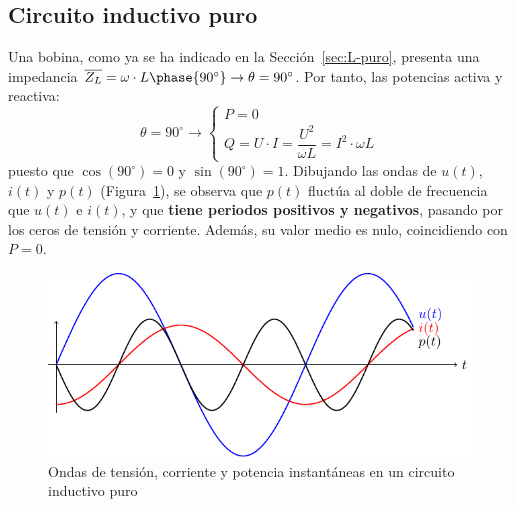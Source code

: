 \subsection{Circuito inductivo puro}\label{sec:potencia_L}
Una bobina, como ya se ha indicado en la Sección~\ref{sec:L-puro},
presenta una impedancia
$\overline{Z_L}=\omega\cdot L\phase{90^\circ}\rightarrow
\theta=90^\circ$. Por tanto, las potencias activa y reactiva:
\begin{equation}
  \theta = 90^\circ \rightarrow
  \boxed{\begin{cases}
    P = 0\\
    Q = U\cdot I = \dfrac{U^2}{\omega L} = I^2\cdot  \omega L
  \end{cases}}
\end{equation}
puesto que $\cos(90^\circ)=0$ y $\sin(90^\circ)=1$. Dibujando las
ondas de $u(t)$, $i(t)$ y $p(t)$ (Figura~\ref{fig:inductivoPotencia}),
se observa que $p(t)$ fluctúa al doble de frecuencia que $u(t)$ e
$i(t)$, y que \textbf{tiene periodos positivos y negativos}, pasando
por los ceros de tensión y corriente. Además, su valor medio es nulo,
coincidiendo con $P=0$.
\begin{figure}[H]
  \centering \includegraphics{../figs/inductivoPuroPotencia.pdf}
  \caption{Ondas de tensión, corriente y potencia instantáneas en un
    circuito inductivo puro}
  \label{fig:inductivoPotencia}
\end{figure}
	
